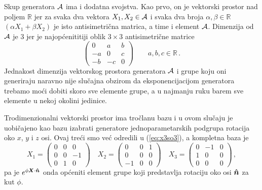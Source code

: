 Skup generatora $\mathcal{A}$ ima i dodatna svojstva. Kao prvo, on je
vektorski prostor nad poljem $\mathbb{R}$ jer za svaka dva vektora
$X_1, X_2\in\mathcal{A}$ i svaka dva broja $\alpha, \beta\in\mathbb{R}$ 
$(\alpha X_1 + \beta X_2)$ je isto antisimetrična matrica, a time i
element $\mathcal{A}$. Dimenzija od $\mathcal{A}$ je 3 jer je najopćenititiji
oblik $3\times 3$ antisimetrične matrice
\begin{equation}
    \begin{pmatrix}
        0 &  a  &  b \\
       -a &  0  &  c \\
       -b & -c  &  0
   \end{pmatrix}  \qquad   a, b, c \in \mathbb{R} \,.
\end{equation}
Jednakost dimenzija vektorskog prostora generatora $\mathcal{A}$ i grupe  koju
oni generiraju naravno nije slučajna obzirom da eksponencijacijom
generatora trebamo moći dobiti skoro sve elemente grupe, a u najmanju ruku
barem sve elemente u nekoj okolini jedinice.

Trodimenzionalni vektorski prostor ima tročlanu bazu i u ovom slučaju je
uobičajeno kao bazu izabrati generatore jednoparametarskih podgrupa rotacija oko
$x$, $y$ i $z$ osi. Ovaj treći smo već odredili u (\ref{eq:x3so3}), a kompletna
baza je
\begin{equation}
X_1=
\begin{pmatrix}
0 & 0 & 0 \\ 
0 & 0 &-1 \\
0 & 1 & 0
\end{pmatrix}  \quad
X_2=
\begin{pmatrix}
0 & 0 & 1 \\ 
0 & 0 & 0 \\
-1& 0 & 0
\end{pmatrix}  \quad
X_3=
\begin{pmatrix}
0 & -1 & 0 \\ 
1& 0 & 0 \\
0 & 0 & 0
\end{pmatrix} \,,
\label{eq:SO3generators}
\end{equation}
pa je $e^{\phi \vec{X}\cdot\unitn}$ onda općeniti element grupe  koji
predstavlja rotaciju oko osi $\unitn$ za kut $\phi$.

